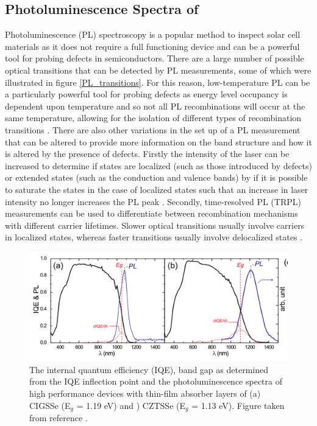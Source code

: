 \subsection{Photoluminescence Spectra of \CZTS}\label{CZTS_PL_section}
Photoluminescence (PL) spectroscopy is a popular method to inspect solar cell materials as it does not require a full functioning device and can be a powerful tool for probing defects in semiconductors. There are a large number of possible optical transitions that can be detected by PL measurements, some of which were illustrated in figure \ref{PL_transitions}. For this reason, low-temperature PL can be a particularly powerful tool for probing defects as energy level occupancy is dependent upon temperature and so not all PL recombinations will occur at the same temperature, allowing for the isolation of different types of recombination transitions \cite{spatial_resolved_book}. There are also other variations in the set up of a PL measurement that can be altered to provide more information on the band structure and how it is altered by the presence of defects. Firstly the intensity of the laser can be increased to determine if states are localized (such as those introduced by defects) or extended states (such as the conduction and valence bands) by if it is possible to saturate the states in the case of localized states such that an increase in laser intensity no longer increases the PL peak \cite{Gershon}. Secondly, time-resolved PL (TRPL) measurements  can be used to differentiate between recombination mechanisms with different carrier lifetimes. Slower optical transitions usually involve carriers in localized states, whereas faster transitions usually involve delocalized states \cite{Gershon}.\\

\begin{figure}[h!]
  \centering
    \includegraphics[width=1.0\textwidth]{figures/CZTS+CIGS_PL.png}
    \caption{The internal quantum efficiency (IQE), band gap as determined from the IQE inflection point and the photoluminescence spectra of high performance devices with thin-film absorber layers of (a) CIGSSe (E$_g$ = 1.19 eV) and ) CZTSSe (E$_g$ = 1.13 eV). Figure taken from reference .}
  \label{CZTS+CIGS_PL}
\end{figure}

